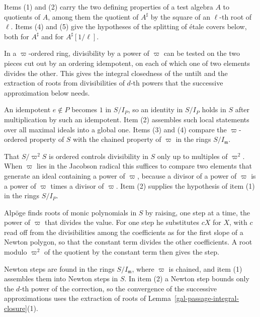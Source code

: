 Items (1) and (2) carry the two defining properties of a test algebra $A$ to quotients of $A$, among
them the quotient of $A^\sharp$ by the square of an $\ell$-th root of $\ell$. Items (4) and (5) give the
hypotheses of the splitting of \'etale covers below, both for $A^\sharp$ and for $A^\sharp[1/\ell]$.

In a $\varpi$-ordered ring, divisibility by a power of $\varpi$ can be tested on the two pieces cut out
by an ordering idempotent, on each of which one of two elements divides the other. This gives the
integral closedness of the untilt and the extraction of roots from divisibilities of $d$-th powers that
the successive approximation below needs.

An idempotent $e\notin P$ becomes $1$ in $S/I_P$, so an identity in $S/I_P$ holds in $S$ after
multiplication by such an idempotent. Item (2) assembles such local statements over all maximal ideals
into a global one. Items (3) and (4) compare the $\varpi$-ordered property of $S$ with the chained
property of $\varpi$ in the rings $S/I_{\mathfrak m}$.

That $S/\varpi^2S$ is ordered controls divisibility in $S$ only up to multiples of $\varpi^2$. When
$\varpi$ lies in the Jacobson radical this suffices to compare two elements that generate an ideal
containing a power of $\varpi$, because a divisor of a power of $\varpi$ is a power of $\varpi$ times a
divisor of $\varpi$. Item (2) supplies the hypothesis of item (1) in the rings $S/I_P$.

Alpöge finds roots of monic polynomials in $S$ by raising, one step at a time, the power of $\varpi$
that divides the value. For one step he substitutes $cX$ for $X$, with $c$ read off from the
divisibilities among the coefficients as for the first slope of a Newton polygon, so that the constant
term divides the other coefficients. A root modulo $\varpi^2$ of the quotient by the constant term then
gives the step.

Newton steps are found in the rings $S/I_{\mathfrak m}$, where $\varpi$ is chained, and item (1)
assembles them into Newton steps in $S$. In item (2) a Newton step bounds only the $d$-th power of the
correction, so the convergence of the successive approximations uses the extraction of roots of
Lemma~\ref{gal-passage-integral-closure}(1).

